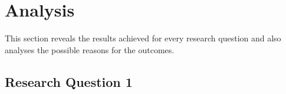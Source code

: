 \documentclass[a4paper, 11pt]{article}
\begin{document}







\pagebreak
\section{Analysis}

This section reveals the results achieved for every research question and also analyses the possible reasons for the outcomes.

\subsection{Research Question 1}
\end{document}
